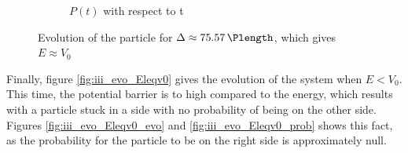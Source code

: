 \documentclass[a4paper,12pt,twoside]{article}
\begin{document}
\begin{figure}[h]
\begin{subfigure}[t]{0.45\textwidth}
        \caption{$P(t)$ with respect to t}
        \label{fig:iii_evo_Eeqv0_prob}
      \end{subfigure}
      \caption{Evolution of the particle for $\Delta \approx \SI{75.57}{\Plength}$, which gives $E \approx V_0$}
      \label{fig:iii_evo_Eeqv0}
    \end{figure}

    Finally, figure \ref{fig:iii_evo_Eleqv0} gives the evolution of the system when $E<V_0$.
    This time, the potential barrier is to high compared to the energy, which results with a particle stuck in a side with no probability of being on the other side.
    Figures \ref{fig:iii_evo_Eleqv0_evo} and \ref{fig:iii_evo_Eleqv0_prob} shows this fact, as the probability for the particle to be on the right side is approximately null.\\
\end{document}
